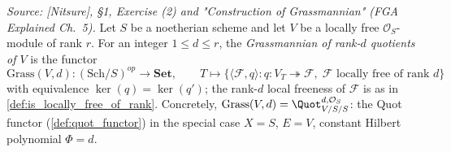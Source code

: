 \begin{definition}
  \label{def:grassmannian_scheme}
  \textit{Source: [Nitsure], \S 1, Exercise (2) and "Construction of
  Grassmannian" (FGA Explained Ch.~5).}
  Let \(S\) be a noetherian scheme and let \(V\) be a locally free
  \(\mathcal{O}_S\)-module of rank \(r\). For an integer \(1 \le d \le r\), the
  \emph{Grassmannian of rank-\(d\) quotients of \(V\)} is the functor
  \[
    \mathrm{Grass}(V, d) : (\mathrm{Sch}/S)^{op} \longrightarrow \mathbf{Set},
    \qquad
    T \longmapsto \{ \langle \mathcal{F}, q\rangle :
    q : V_T \twoheadrightarrow \mathcal{F},\; \mathcal{F}
    \text{ locally free of rank } d \}
  \]
  with equivalence \(\ker(q) = \ker(q')\); the rank-\(d\) local freeness of
  \(\mathcal{F}\) is as in \cref{def:is_locally_free_of_rank}. Concretely,
  \(\mathrm{Grass}(V, d) = \Quot^{d,\mathcal{O}_S}_{V/S/S}\): the Quot functor
  (\cref{def:quot_functor}) in the special case \(X = S\), \(E = V\), constant
  Hilbert polynomial \(\Phi = d\).
\end{definition}


